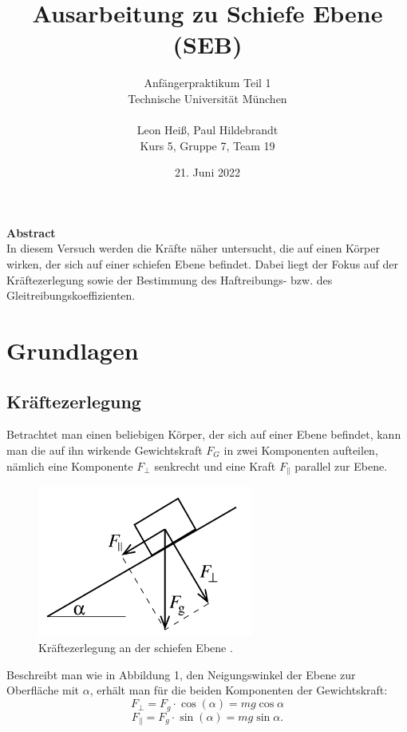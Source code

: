 \documentclass{article}
\title{Ausarbeitung zu Schiefe Ebene (SEB)}
\author{Anfängerpraktikum Teil 1 \\Technische Universität München\\\\Leon Heiß, Paul Hildebrandt \\
Kurs 5, Gruppe 7, Team 19}
\date{21. Juni 2022}
\begin{document}
\maketitle

\large
\begin{center}
\textbf{Abstract}\\
\normalsize
\medskip
In diesem Versuch werden die Kräfte näher untersucht, die auf einen Körper wirken, der sich auf einer schiefen Ebene befindet. Dabei liegt der Fokus auf der Kräftezerlegung sowie der Bestimmung des Haftreibungs- bzw. des Gleitreibungskoeffizienten.

\end{center}
\normalsize

\tableofcontents

\section{Grundlagen}
\subsection{Kräftezerlegung}
Betrachtet man einen beliebigen Körper, der sich auf einer Ebene befindet, kann man die auf ihn wirkende Gewichtskraft $F_G$ in zwei Komponenten aufteilen, nämlich eine Komponente $F_{\bot}$ senkrecht und eine Kraft $F_{\parallel}$ parallel zur Ebene.
\begin{figure}[hbt!]
\centering
\includegraphics[width=200pt]{zerlegung.png}
\caption{Kräftezerlegung an der schiefen Ebene \cite{1}.}
\label{fig:length_eight_mouse}
\end{figure}
Beschreibt man wie in Abbildung 1, den Neigungswinkel der Ebene zur Oberfläche mit $\alpha$, erhält man für die beiden Komponenten der Gewichtskraft:
\begin{equation}
    F_{\bot} = F_g \cdot \cos(\alpha) = mg \cos \alpha
\end{equation}
\begin{equation}
    F_{\parallel} = F_g \cdot \sin(\alpha) = mg \sin \alpha.
\end{equation}
\end{document}
